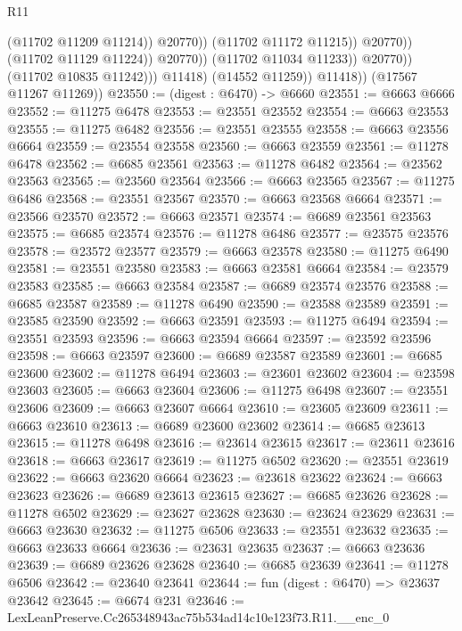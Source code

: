 \begin{lexlean}{R11}
\begin{coremodule}
                                          (@11702 @11209 @11214))
                                        @20770))
                                    (@11702 @11172 @11215))
                                  @20770))
                              (@11702 @11129 @11224))
                            @20770))
                        (@11702 @11034 @11233))
                      @20770))
                  (@11702 @10835 @11242)))
              @11418)
            (@14552 @11259))
          @11418))
      (@17567 @11267 @11269))
@23550 := (digest : @6470) -> @6660
@23551 := @6663 @6666
@23552 := @11275 @6478
@23553 := @23551 @23552
@23554 := @6663 @23553
@23555 := @11275 @6482
@23556 := @23551 @23555
@23558 := @6663 @23556 @6664
@23559 := @23554 @23558
@23560 := @6663 @23559
@23561 := @11278 @6478
@23562 := @6685 @23561
@23563 := @11278 @6482
@23564 := @23562 @23563
@23565 := @23560 @23564
@23566 := @6663 @23565
@23567 := @11275 @6486
@23568 := @23551 @23567
@23570 := @6663 @23568 @6664
@23571 := @23566 @23570
@23572 := @6663 @23571
@23574 := @6689 @23561 @23563
@23575 := @6685 @23574
@23576 := @11278 @6486
@23577 := @23575 @23576
@23578 := @23572 @23577
@23579 := @6663 @23578
@23580 := @11275 @6490
@23581 := @23551 @23580
@23583 := @6663 @23581 @6664
@23584 := @23579 @23583
@23585 := @6663 @23584
@23587 := @6689 @23574 @23576
@23588 := @6685 @23587
@23589 := @11278 @6490
@23590 := @23588 @23589
@23591 := @23585 @23590
@23592 := @6663 @23591
@23593 := @11275 @6494
@23594 := @23551 @23593
@23596 := @6663 @23594 @6664
@23597 := @23592 @23596
@23598 := @6663 @23597
@23600 := @6689 @23587 @23589
@23601 := @6685 @23600
@23602 := @11278 @6494
@23603 := @23601 @23602
@23604 := @23598 @23603
@23605 := @6663 @23604
@23606 := @11275 @6498
@23607 := @23551 @23606
@23609 := @6663 @23607 @6664
@23610 := @23605 @23609
@23611 := @6663 @23610
@23613 := @6689 @23600 @23602
@23614 := @6685 @23613
@23615 := @11278 @6498
@23616 := @23614 @23615
@23617 := @23611 @23616
@23618 := @6663 @23617
@23619 := @11275 @6502
@23620 := @23551 @23619
@23622 := @6663 @23620 @6664
@23623 := @23618 @23622
@23624 := @6663 @23623
@23626 := @6689 @23613 @23615
@23627 := @6685 @23626
@23628 := @11278 @6502
@23629 := @23627 @23628
@23630 := @23624 @23629
@23631 := @6663 @23630
@23632 := @11275 @6506
@23633 := @23551 @23632
@23635 := @6663 @23633 @6664
@23636 := @23631 @23635
@23637 := @6663 @23636
@23639 := @6689 @23626 @23628
@23640 := @6685 @23639
@23641 := @11278 @6506
@23642 := @23640 @23641
@23644 := fun (digest : @6470) => @23637 @23642
@23645 := @6674 @231
@23646 := LexLeanPreserve.Cc265348943ac75b534ad14c10e123f73.R11.__enc_0

\end{coremodule}
\end{lexlean}
